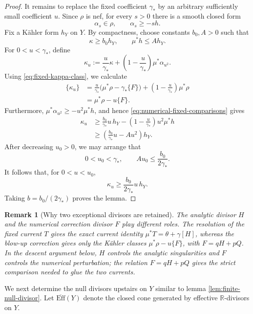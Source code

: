 \documentclass[reqno]{amsart}
\theoremstyle{remark}
\def\R{\mathbb{R}}
\newcommand{\Eff}{\text{Eff}}
\theoremstyle{plain}
\newtheorem{rmk}[thm]{Remark}
\begin{document}
\begin{proof}
It remains to replace the fixed coefficient $\gamma_*$ by an
arbitrary sufficiently small coefficient $u$.  Since $\rho$ is
nef, for every $s>0$ there is a smooth closed form
\[
 \alpha_s\in\rho,\qquad \alpha_s\geq-sh.
\]
Fix a K\"ahler form $h_Y$ on $Y$.  By compactness, choose constants
$b_0,A>0$ such that
\begin{equation}\label{eq:numerical-fixed-comparisons}
 \kappa\geq b_0h_Y,\qquad \mu^*h\leq Ah_Y.
\end{equation}
For $0<u<\gamma_*$, define
\begin{equation}\label{eq:numerical-kappa-u}
 \kappa_u
 :=
 \frac{u}{\gamma_*}\kappa+
 \left(1-\frac{u}{\gamma_*}\right)\mu^*\alpha_{u^2}.
\end{equation}
Using \eqref{eq:fixed-kappa-class}, we calculate
\[
\begin{aligned}
 \{\kappa_u\}
 &=
 \frac{u}{\gamma_*}
   \bigl(\mu^*\rho-\gamma_*\{F\}\bigr)
 +\left(1-\frac{u}{\gamma_*}\right)\mu^*\rho\\
 &=\mu^*\rho-u\{F\}.
\end{aligned}
\]
Furthermore, $\mu^*\alpha_{u^2}\geq-u^2\mu^*h$, and hence
\eqref{eq:numerical-fixed-comparisons} gives
\[
\begin{aligned}
 \kappa_u
 &\geq
 \frac{b_0}{\gamma_*}u\,h_Y
 -\left(1-\frac{u}{\gamma_*}\right)u^2\mu^*h\\
 &\geq
 \left(\frac{b_0}{\gamma_*}u-Au^2\right)h_Y.
\end{aligned}
\]
After decreasing $u_0>0$, we may arrange that
\[
 0<u_0<\gamma_*,
 \qquad
 Au_0\leq\frac{b_0}{2\gamma_*}.
\]
It follows that, for $0<u<u_0$,
\[
 \kappa_u\geq
 \frac{b_0}{2\gamma_*}u\,h_Y.
\]
Taking $b=b_0/(2\gamma_*)$ proves the lemma. 
\end{proof}

\begin{rmk}[Why two exceptional divisors are retained]
\label{rem:two-resolved-divisors}
The analytic divisor $H$ and the numerical correction divisor $F$
play different roles.  The resolution of the fixed current $T$
gives the exact current identity
$\mu^*T=\theta+\gamma[H]$, whereas the blow-up correction gives only
the K\"ahler classes $\mu^*\rho-u\{F\}$, with
$F=qH+pQ$.   In the descent argument
below, $H$ controls the analytic singularities and $F$ controls the
numerical perturbation; the relation $F=qH+pQ$ gives the strict
comparison needed to glue the two currents.
\end{rmk}


We next determine the null divisors upstairs on $Y$ similar to lemma \ref{lem:finite-null-divisor}. Let $\overline{\Eff}(Y)$ denote the closed cone generated by effective $\R$-divisors on $Y$.
\end{document}
